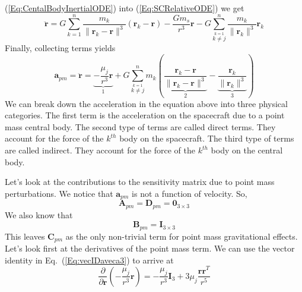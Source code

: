 (\ref{Eq:CentalBodyInertialODE}) into (\ref{Eq:SCRelativeODE}) we
get
%
\begin{equation}
     \ddot{\mathbf{r}} =      G\sum_{k=1}^n \frac{m_k}{\| \mathbf{r}_{k} - \mathbf{r}\|^3} \left(\mathbf{r}_{k} -
     \mathbf{r}\right) - \frac{G m_s
     }{r^3}\mathbf{r} -
     G\sum_{\stackrel{k=1}{k \neq j}}^{n} \frac{ m_k}{\|
     \mathbf{r}_{k}\|^3}\mathbf{r}_{k}
\end{equation}
%
Finally, collecting terms yields
%
\begin{equation}
     \mathbf{a}_{pm} = \ddot{\mathbf{r}} =   \underbrace{- \frac{\mu_j
     }{r^3}\mathbf{r}}_1  +  G \sum_{\stackrel{k=1}{k \neq j}}^{n} m_k\left( \underbrace{\frac{\mathbf{r}_{k} -
     \mathbf{r}}{\| \mathbf{r}_{k} - \mathbf{r}\|^3}}_2  -
     \underbrace{
      \frac{ \mathbf{r}_{k}}{\|
     \mathbf{r}_{k}\|^3}}_3\right)
\end{equation}
%
We can break down the acceleration in the equation above into three
physical categories.   The first term is the acceleration on the
spacecraft due to a point mass central body.   The second type of
terms are called direct terms.  They account for the force of the
$k^{th}$ body on the spacecraft.  The third type of terms are called
indirect.  They account for the force of the $k^{th}$ body on the
central body.

Let's look at the contributions to the sensitivity matrix due to
point mass perturbations.  We notice that $\mathbf{a}_{pm}$ is not a
function of velocity.  So,
%
\begin{equation}
    \mathbf{A}_{pm} = \mathbf{D}_{pm}  = \mathbf{0}_{3\times3}
\end{equation}
%
We also know that
%
\begin{equation}
    \mathbf{B}_{pm} = \mathbf{I}_{3\times3}
\end{equation}
%
This leaves $\mathbf{C}_{pm}$ as the only non-trivial term for point
mass gravitational effects.  Let's look first at the derivatives of
the point mass term.  We can use the vector identity in
Eq.~(\ref{Eq:vecIDaveca3}) to arrive at
%
\begin{equation}
     \frac{\partial }{\partial \mathbf{r}} \left(- \frac{\mu_j
     }{r^3}\mathbf{r}\right) =  -\frac{\mu_j}{r^3} \mathbf{I}_3
     + 3\mu_j\frac{\mathbf{r}\mathbf{r}^T}{r^5}
\end{equation}

